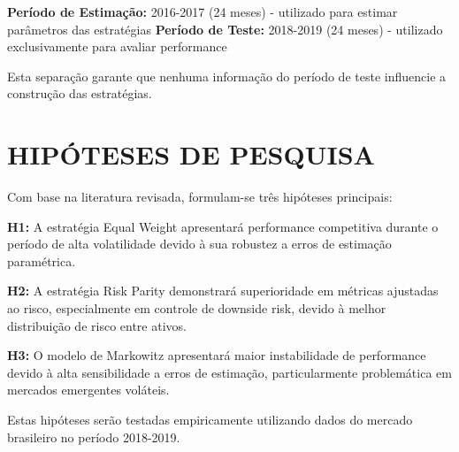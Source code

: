 \textbf{Período de Estimação:} 2016-2017 (24 meses) - utilizado para estimar parâmetros das estratégias
\textbf{Período de Teste:} 2018-2019 (24 meses) - utilizado exclusivamente para avaliar performance

Esta separação garante que nenhuma informação do período de teste influencie a construção das estratégias.

\section{HIPÓTESES DE PESQUISA}

Com base na literatura revisada, formulam-se três hipóteses principais:

\textbf{H1:} A estratégia Equal Weight apresentará performance competitiva durante o período de alta volatilidade devido à sua robustez a erros de estimação paramétrica.

\textbf{H2:} A estratégia Risk Parity demonstrará superioridade em métricas ajustadas ao risco, especialmente em controle de downside risk, devido à melhor distribuição de risco entre ativos.

\textbf{H3:} O modelo de Markowitz apresentará maior instabilidade de performance devido à alta sensibilidade a erros de estimação, particularmente problemática em mercados emergentes voláteis.

Estas hipóteses serão testadas empiricamente utilizando dados do mercado brasileiro no período 2018-2019.